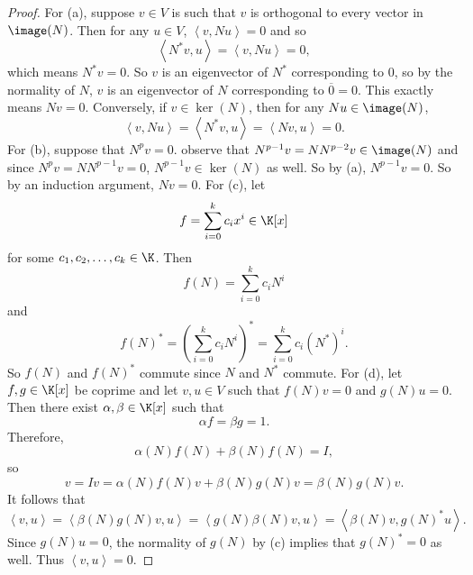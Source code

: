 \documentclass[linearalgebraII]{subfiles}
\begin{document}
    \begin{proof}
        For (a), suppose $v\in V$ is such that $v$ is orthogonal to every vector in $\image(N)$. Then for any $u\in V$, $\left\langle v, Nu\right\rangle =0$ and so
        \begin{equation*}
            \left\langle N^{*} v, u\right\rangle = \left\langle v, Nu\right\rangle = 0,
        \end{equation*}
        which means $N^{*} v = 0$. So $v$ is an eigenvector of $N^{*} $ corresponding to $0$, so by the normality of $N$, $v$ is an eigenvector of $N$ corresponding to $\overline{0} =0$. This exactly means $Nv = 0$. Conversely, if $v\in\ker(N)$, then for any $Nu\in\image(N)$,
        \begin{equation*}
            \left\langle v, Nu\right\rangle = \left\langle N^{*} v, u\right\rangle = \left\langle Nv, u\right\rangle = 0. 
        \end{equation*}
        For (b), suppose that $N^pv = 0$. observe that $N^{p-1}v=NN^{p-2}v\in\image(N)$ and since $N^{p}v = NN^{p-1}v = 0$, $N^{p-1}v\in\ker(N)$ as well. So by (a), $N^{p-1}v = 0$. So by an induction argument, $Nv = 0$. For (c), let
        \begin{equation*}
            f = \sum^{k}_{i=0} c_ix^i\in\K[x]
        \end{equation*}
        for some $c_1,c_2,\ldots,c_k\in\K$. Then
        \begin{equation*}
            f(N) = \sum^{k}_{i=0} c_iN^i
        \end{equation*}
        and
        \begin{equation*}
            f(N)^* = \left( \sum^{k}_{i=0} c_iN^i \right) ^{*} = \sum^{k}_{i=0} c_i\left( N^{*} \right) ^i.
        \end{equation*}
        So $f(N)$ and $f(N)^{*} $ commute since $N$ and $N^{*} $ commute. For (d), let $f,g\in\K[x]$ be coprime and let $v,u\in V$ such that $f(N)v = 0$ and $g(N)u=0$. Then there exist $\alpha,\beta\in\K[x]$ such that
        \begin{equation*}
            \alpha f = \beta g = 1.
        \end{equation*}
        Therefore,
        \begin{equation*}
            \alpha(N)f(N) + \beta(N)f(N) = I,
        \end{equation*}
        so
        \begin{equation*}
            v = Iv = \alpha(N)f(N)v + \beta(N)g(N)v = \beta(N)g(N)v.
        \end{equation*}
        It follows that
        \begin{equation*}
            \left\langle v, u\right\rangle = \left\langle \beta(N)g(N)v, u\right\rangle = \left\langle g(N)\beta(N)v, u\right\rangle = \left\langle \beta(N)v, g(N)^{*} u\right\rangle .
        \end{equation*}
        Since $g(N)u = 0$, the normality of $g(N)$ by (c) implies that $g(N)^{*} = 0$ as well. Thus $\left\langle v, u\right\rangle = 0$.
    \end{proof}
\end{document}
